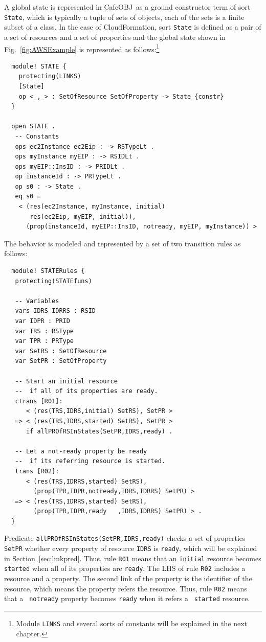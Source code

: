\documentclass[12pt]{report}
\newcommand{\stt}[1]{{\small{\tt {#1}}}}
\newcommand{\cafeobj}{{\sf CafeOBJ}~}
\begin{document}
A global state is represented in \cafeobj as a ground constructor term
of sort {\tt State}, which is typically a tuple of sets of objects,
each of the sets is a finite subset of a class.  In the case of
CloudFormation, sort {\tt State} is defined as a pair of a set of
resources and a set of properties and the global state shown in
Fig.~\ref{fig:AWSExample} is represented as follows:\footnote{Module
  {\tt LINKS} and several sorts of constants will be explained in the
  next chapter.}
\begin{verbatim}
  module! STATE {
    protecting(LINKS)
    [State]
    op <_,_> : SetOfResource SetOfProperty -> State {constr}
  }
  
  open STATE . 
   -- Constants
   ops ec2Instance ec2Eip : -> RSTypeLt .
   ops myInstance myEIP : -> RSIDLt .
   ops myEIP::InsID : -> PRIDLt .
   op instanceId : -> PRTypeLt .
   op s0 : -> State .
   eq s0 =
    < (res(ec2Instance, myInstance, initial) 
       res(ec2Eip, myEIP, initial)),
      (prop(instanceId, myEIP::InsID, notready, myEIP, myInstance)) >
\end{verbatim}
The behavior is modeled and represented by a set of two transition
rules as follows:
\begin{verbatim}
  module! STATERules {
   protecting(STATEfuns)
  
   -- Variables
   vars IDRS IDRRS : RSID 
   var IDPR : PRID
   var TRS : RSType
   var TPR : PRType
   var SetRS : SetOfResource
   var SetPR : SetOfProperty
  
   -- Start an initial resource
   --  if all of its properties are ready.
   ctrans [R01]:
      < (res(TRS,IDRS,initial) SetRS), SetPR >
   => < (res(TRS,IDRS,started) SetRS), SetPR > 
      if allPROfRSInStates(SetPR,IDRS,ready) .
  
   -- Let a not-ready property be ready 
   --  if its referring resource is started.
   trans [R02]:
      < (res(TRS,IDRRS,started) SetRS), 
        (prop(TPR,IDPR,notready,IDRS,IDRRS) SetPR) >
   => < (res(TRS,IDRRS,started) SetRS), 
        (prop(TPR,IDPR,ready   ,IDRS,IDRRS) SetPR) > .
  }
\end{verbatim}
Predicate \stt{allPROfRSInStates(SetPR,IDRS,ready)} checks a set of
properties {\tt SetPR} whether every property of resource {\tt IDRS}
is {\tt ready}, which will be explained in Section~\ref{sec:linkpred}.
Thus, rule {\tt R01} means that an {\tt initial} resource becomes {\tt
  started} when all of its properties are {\tt ready}.  The LHS of
rule {\tt R02} includes a resource and a property.  The second link of
the property is the identifier of the resource, which means the
property refers the resource.  Thus, rule {\tt R02} means that a {\tt
  notready} property becomes {\tt ready} when it refers a {\tt
  started} resource.
\end{document}
